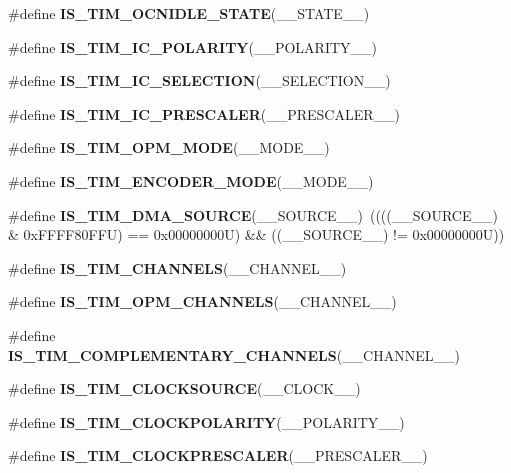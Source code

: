 \begin{DoxyCompactItemize}
\item 
\#define {\bfseries I\+S\+\_\+\+T\+I\+M\+\_\+\+O\+C\+N\+I\+D\+L\+E\+\_\+\+S\+T\+A\+TE}(\+\_\+\+\_\+\+S\+T\+A\+T\+E\+\_\+\+\_\+)
\item 
\#define {\bfseries I\+S\+\_\+\+T\+I\+M\+\_\+\+I\+C\+\_\+\+P\+O\+L\+A\+R\+I\+TY}(\+\_\+\+\_\+\+P\+O\+L\+A\+R\+I\+T\+Y\+\_\+\+\_\+)
\item 
\#define {\bfseries I\+S\+\_\+\+T\+I\+M\+\_\+\+I\+C\+\_\+\+S\+E\+L\+E\+C\+T\+I\+ON}(\+\_\+\+\_\+\+S\+E\+L\+E\+C\+T\+I\+O\+N\+\_\+\+\_\+)
\item 
\#define {\bfseries I\+S\+\_\+\+T\+I\+M\+\_\+\+I\+C\+\_\+\+P\+R\+E\+S\+C\+A\+L\+ER}(\+\_\+\+\_\+\+P\+R\+E\+S\+C\+A\+L\+E\+R\+\_\+\+\_\+)
\item 
\#define {\bfseries I\+S\+\_\+\+T\+I\+M\+\_\+\+O\+P\+M\+\_\+\+M\+O\+DE}(\+\_\+\+\_\+\+M\+O\+D\+E\+\_\+\+\_\+)
\item 
\#define {\bfseries I\+S\+\_\+\+T\+I\+M\+\_\+\+E\+N\+C\+O\+D\+E\+R\+\_\+\+M\+O\+DE}(\+\_\+\+\_\+\+M\+O\+D\+E\+\_\+\+\_\+)
\item 
\mbox{\label{group___t_i_m___private___macros_ga6a33061de13fdde7df1a85d2402e69c9}} 
\#define {\bfseries I\+S\+\_\+\+T\+I\+M\+\_\+\+D\+M\+A\+\_\+\+S\+O\+U\+R\+CE}(\+\_\+\+\_\+\+S\+O\+U\+R\+C\+E\+\_\+\+\_\+)~((((\+\_\+\+\_\+\+S\+O\+U\+R\+C\+E\+\_\+\+\_\+) \& 0x\+F\+F\+F\+F80\+F\+F\+U) == 0x00000000\+U) \&\& ((\+\_\+\+\_\+\+S\+O\+U\+R\+C\+E\+\_\+\+\_\+) != 0x00000000\+U))
\item 
\#define {\bfseries I\+S\+\_\+\+T\+I\+M\+\_\+\+C\+H\+A\+N\+N\+E\+LS}(\+\_\+\+\_\+\+C\+H\+A\+N\+N\+E\+L\+\_\+\+\_\+)
\item 
\#define {\bfseries I\+S\+\_\+\+T\+I\+M\+\_\+\+O\+P\+M\+\_\+\+C\+H\+A\+N\+N\+E\+LS}(\+\_\+\+\_\+\+C\+H\+A\+N\+N\+E\+L\+\_\+\+\_\+)
\item 
\#define {\bfseries I\+S\+\_\+\+T\+I\+M\+\_\+\+C\+O\+M\+P\+L\+E\+M\+E\+N\+T\+A\+R\+Y\+\_\+\+C\+H\+A\+N\+N\+E\+LS}(\+\_\+\+\_\+\+C\+H\+A\+N\+N\+E\+L\+\_\+\+\_\+)
\item 
\#define {\bfseries I\+S\+\_\+\+T\+I\+M\+\_\+\+C\+L\+O\+C\+K\+S\+O\+U\+R\+CE}(\+\_\+\+\_\+\+C\+L\+O\+C\+K\+\_\+\+\_\+)
\item 
\#define {\bfseries I\+S\+\_\+\+T\+I\+M\+\_\+\+C\+L\+O\+C\+K\+P\+O\+L\+A\+R\+I\+TY}(\+\_\+\+\_\+\+P\+O\+L\+A\+R\+I\+T\+Y\+\_\+\+\_\+)
\item 
\#define {\bfseries I\+S\+\_\+\+T\+I\+M\+\_\+\+C\+L\+O\+C\+K\+P\+R\+E\+S\+C\+A\+L\+ER}(\+\_\+\+\_\+\+P\+R\+E\+S\+C\+A\+L\+E\+R\+\_\+\+\_\+)

\end{DoxyCompactItemize}
